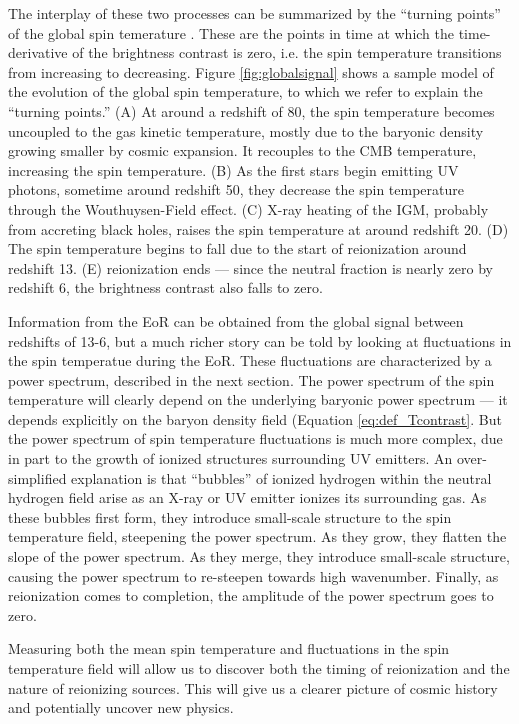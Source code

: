The interplay of these two processes can be summarized by the ``turning points'' of the global
spin temerature \cite[][e.g.]{Harker2012,Mirocha2013,Liu2013}. These are the points in time at which
the time-derivative of the brightness contrast is zero, i.e. the spin temperature transitions from
increasing to decreasing. Figure \ref{fig:globalsignal} shows a sample
model of the evolution of the global spin temperature, to which we refer to explain the ``turning
points.'' (A) At around a redshift of 80, the spin temperature becomes uncoupled to the gas kinetic
temperature, mostly due to the baryonic density growing smaller by cosmic expansion. It recouples to
the CMB temperature, increasing the spin temperature. (B) As the first stars begin emitting UV photons, sometime around redshift 50,
they decrease the spin temperature through the Wouthuysen-Field effect. (C) X-ray heating of the IGM, probably from accreting black holes, raises the spin
temperature at around redshift 20. (D) The spin temperature begins to fall due to the start of
reionization around redshift 13. (E) reionization ends --- since the neutral fraction
is nearly zero by redshift 6, the brightness contrast also falls to zero.

Information from the EoR can be obtained from the global signal between redshifts of 13-6, but a much
richer story can be told by looking at fluctuations in the spin temperatue during the EoR. These
fluctuations are characterized by a power spectrum, described in the next section. The power
spectrum of the spin temperature will clearly depend on the underlying baryonic power spectrum ---
it depends explicitly on the baryon density field (Equation \ref{eq:def_Tcontrast}. But the power
spectrum of spin temperature fluctuations is much more complex, due in part to the growth of ionized
structures surrounding UV emitters. An over-simplified explanation is that ``bubbles'' of ionized
hydrogen within the neutral hydrogen field arise as an X-ray or UV emitter ionizes its surrounding
gas. As these bubbles first form, they introduce small-scale structure to the spin temperature
field, steepening the power spectrum. As they  grow, they flatten the slope of the power spectrum. 
As they merge, they introduce small-scale structure, causing the power spectrum to re-steepen towards 
high wavenumber. Finally, as reionization comes to completion, the amplitude of the power spectrum
goes to zero.

Measuring both the mean spin temperature and fluctuations in the spin temperature field will allow
us to discover both the timing of reionization and the nature of reionizing sources. This will give
us a clearer picture of cosmic history and potentially uncover new physics.
